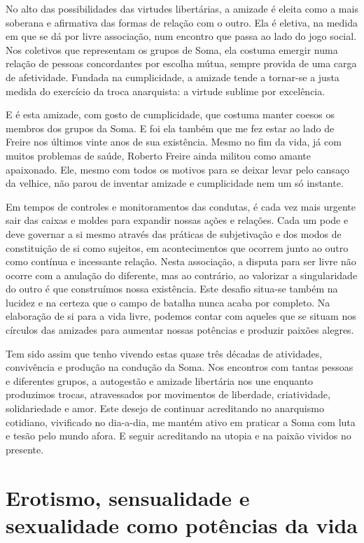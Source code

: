 No alto das possibilidades das virtudes libertárias, a amizade é eleita
como a mais soberana e afirmativa das formas de relação com o outro. Ela
é eletiva, na medida em que se dá por livre associação, num encontro que
passa ao lado do jogo social. Nos coletivos que representam os grupos de
Soma, ela costuma emergir numa relação de pessoas concordantes por
escolha mútua, sempre provida de uma carga de afetividade. Fundada na
cumplicidade, a amizade tende a tornar-se a justa medida do exercício da
troca anarquista: a virtude sublime por excelência.

E é esta amizade, com gosto de cumplicidade, que costuma manter coesos
os membros dos grupos da Soma. E foi ela também que me fez estar ao lado
de Freire nos últimos vinte anos de sua existência. Mesmo no fim da
vida, já com muitos problemas de saúde, Roberto Freire ainda militou
como amante apaixonado. Ele, mesmo com todos os motivos para se deixar
levar pelo cansaço da velhice, não parou de inventar amizade e
cumplicidade nem um só instante.

Em tempos de controles e monitoramentos das condutas, é cada vez mais
urgente sair das caixas e moldes para expandir nossas ações e relações.
Cada um pode e deve governar a si mesmo através das práticas de
subjetivação e dos modos de constituição de si como sujeitos, em
acontecimentos que ocorrem junto ao outro como contínua e incessante
relação. Nesta associação, a disputa para ser livre não ocorre com a
anulação do diferente, mas ao contrário, ao valorizar a singularidade do
outro é que construímos nossa existência. Este desafio situa-se também
na lucidez e na certeza que o campo de batalha nunca acaba por completo.
Na elaboração de si para a vida livre, podemos contar com aqueles que se
situam nos círculos das amizades para aumentar nossas potências e
produzir paixões alegres.

Tem sido assim que tenho vivendo estas quase três décadas de atividades,
convivência e produção na condução da Soma. Nos encontros com tantas
pessoas e diferentes grupos, a autogestão e amizade libertária nos une
enquanto produzimos trocas, atravessados por movimentos de liberdade,
criatividade, solidariedade e amor. Este desejo de continuar acreditando
no anarquismo cotidiano, vivificado no dia-a-dia, me mantém ativo em
praticar a Soma com luta e tesão pelo mundo afora. E seguir acreditando
na utopia e na paixão vividos no presente.

\section{Erotismo, sensualidade e sexualidade como potências da vida}

